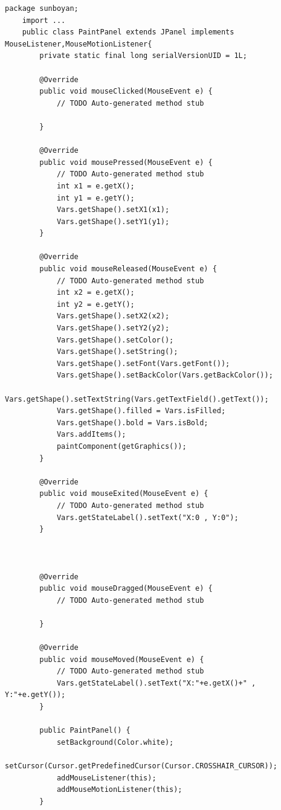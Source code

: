 \documentclass{ctexart}
\begin{document}
\begin{lstlisting}[caption = PaintPanel.java]
    package sunboyan;
    import ...
    public class PaintPanel extends JPanel implements MouseListener,MouseMotionListener{
        private static final long serialVersionUID = 1L;
    
        @Override
        public void mouseClicked(MouseEvent e) {
            // TODO Auto-generated method stub
            
        }
    
        @Override
        public void mousePressed(MouseEvent e) {
            // TODO Auto-generated method stub
            int x1 = e.getX();
            int y1 = e.getY();
            Vars.getShape().setX1(x1);
            Vars.getShape().setY1(y1);
        }
    
        @Override
        public void mouseReleased(MouseEvent e) {
            // TODO Auto-generated method stub
            int x2 = e.getX();
            int y2 = e.getY();
            Vars.getShape().setX2(x2);
            Vars.getShape().setY2(y2);
            Vars.getShape().setColor();
            Vars.getShape().setString();
            Vars.getShape().setFont(Vars.getFont());
            Vars.getShape().setBackColor(Vars.getBackColor());
            Vars.getShape().setTextString(Vars.getTextField().getText());
            Vars.getShape().filled = Vars.isFilled;
            Vars.getShape().bold = Vars.isBold;
            Vars.addItems();
            paintComponent(getGraphics());
        }
        
        @Override
        public void mouseExited(MouseEvent e) {
            // TODO Auto-generated method stub
            Vars.getStateLabel().setText("X:0 , Y:0");
        }
        
        
    
        @Override
        public void mouseDragged(MouseEvent e) {
            // TODO Auto-generated method stub
            
        }
    
        @Override
        public void mouseMoved(MouseEvent e) {
            // TODO Auto-generated method stub
            Vars.getStateLabel().setText("X:"+e.getX()+" , Y:"+e.getY());
        }
    
        public PaintPanel() {
            setBackground(Color.white);
            setCursor(Cursor.getPredefinedCursor(Cursor.CROSSHAIR_CURSOR));
            addMouseListener(this);
            addMouseMotionListener(this);
        }
        

\end{lstlisting}
\end{document}
